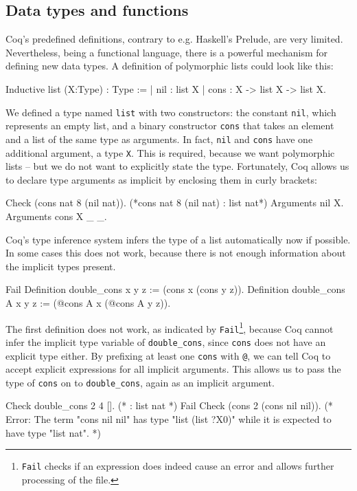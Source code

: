 \documentclass[paper = a4, fleqn, abstract=on, twoside]{scrreprt}
\newcommand{\coqinline}[1]{\texttt{#1}}
\begin{document}
\subsection{Data types and functions}
Coq's predefined definitions, contrary to e.g. Haskell's Prelude, are very limited. Nevertheless, being a functional language, there is a powerful mechanism for defining new data types. A definition of polymorphic lists could look like this:
\begin{coqcode}
Inductive list (X:Type) : Type :=
  | nil  : list X
  | cons : X -> list X -> list X.
\end{coqcode}
We defined a type named \coqinline{list} with two constructors: the constant \coqinline{nil}, which represents an empty list, and a binary constructor \coqinline{cons} that takes an element and a list of the same type as arguments. In fact, \coqinline{nil} and \coqinline{cons} have one additional argument, a type \coqinline{X}. This is required, because we want polymorphic lists -- but we do not want to explicitly state the type. Fortunately, Coq allows us to declare type arguments as implicit by enclosing them in curly brackets:
\begin{coqcode}
Check (cons nat 8 (nil nat)). (*cons nat 8 (nil nat) : list nat*)
Arguments nil {X}.
Arguments cons {X} _ _.
\end{coqcode}
Coq's type inference system infers the type of a list automatically now if possible. In some cases this does not work, because there is not enough information about the implicit types present. 
\begin{coqcode}
Fail Definition double_cons x y z := (cons x (cons y z)).
Definition double_cons {A} x y z := (@cons A x (@cons A y z)).
\end{coqcode}
The first definition does not work, as indicated by \coqinline{Fail}\footnote{\coqinline{Fail} checks if an expression does indeed cause an error and allows further processing of the file.}, because Coq cannot infer the implicit type variable of \coqinline{double_cons}, since \coqinline{cons} does not have an explicit type either. By prefixing at least one \coqinline{cons} with \coqinline{@}, we can tell Coq to accept explicit expressions for all implicit arguments. This allows us to pass the type of \coqinline{cons} on to \coqinline{double_cons}, again as an implicit argument.
\begin{coqcode}
Check double_cons 2 4 []. (* : list nat *)
Fail Check (cons 2 (cons nil nil)). 
(* Error: The term "cons nil nil" has type "list (list ?X0)"
while it is expected to have type "list nat". *)
\end{coqcode}
\end{document}
